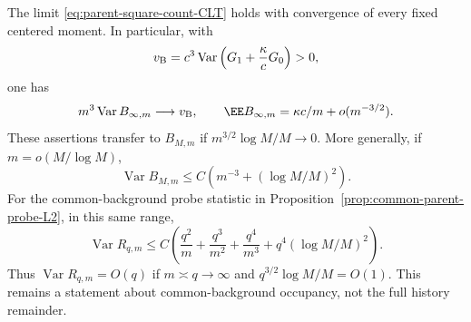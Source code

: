\documentclass[11pt,letterpaper]{article}
\begin{document}
\begin{corollary}
\label{cor:parent-count-moments}
The limit \eqref{eq:parent-square-count-CLT} holds with
convergence of every fixed centered moment. In particular,
with
\[
 v_{\rm B}=c^3\operatorname{Var}
                    \left(G_1+\frac\kappa cG_0\right)>0,
\]
one has
\begin{equation}\label{eq:parent-count-variance}
 m^3\operatorname{Var}B_{\infty,m}\longrightarrow v_{\rm B},
 \qquad \EE B_{\infty,m}=\kappa c/m+o(m^{-3/2}).
\end{equation}
These assertions transfer to $B_{M,m}$ if
$m^{3/2}\log M/M\to0$. More generally, if $m=o(M/\log M)$,
\begin{equation}\label{eq:finite-parent-count-variance-bound}
 \operatorname{Var}B_{M,m}
       \le C\left(m^{-3}+(\log M/M)^2\right).
\end{equation}
For the common-background probe statistic in
Proposition~\ref{prop:common-parent-probe-L2}, in this same range,
\begin{equation}\label{eq:unconditional-parent-probe-variance}
 \operatorname{Var}R_{q,m}
  \le C\left(\frac{q^2}m+\frac{q^3}{m^2}
            +\frac{q^4}{m^3}+q^4(\log M/M)^2\right).
\end{equation}
Thus $\operatorname{Var}R_{q,m}=O(q)$ if $m\asymp q\to\infty$
and $q^{3/2}\log M/M=O(1)$. This remains a statement about
common-background occupancy, not the full history remainder.
\end{corollary}
\end{document}
